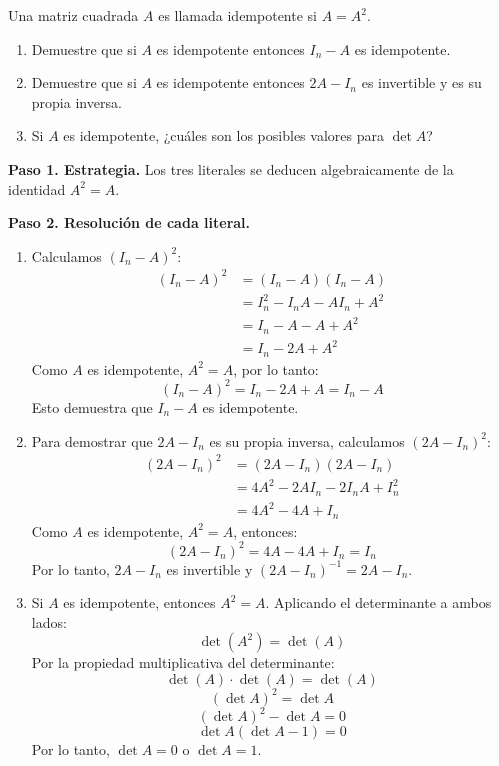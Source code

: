 \begin{prob} Una matriz cuadrada $A$ es llamada idempotente si $A=A^2.$
\begin{enumerate}[$(a)$]
\item Demuestre que si $A$ es idempotente entonces $I_n-A$ es idempotente.
\item Demuestre que si $A$ es idempotente entonces $2A-I_n$ es invertible y es su propia inversa.
\item Si $A$ es idempotente, ¿cuáles son los posibles valores para $\det A$?
\end{enumerate}

\begin{myproof}
\textbf{Paso 1. Estrategia.} Los tres literales se deducen algebraicamente de la identidad $A^2=A$.

\textbf{Paso 2. Resolución de cada literal.}
\begin{enumerate}[$(a)$]
\item Calculamos $(I_n-A)^2$:
\begin{align*}
(I_n-A)^2 &= (I_n-A)(I_n-A) \\
&= I_n^2 - I_nA - AI_n + A^2 \\
&= I_n - A - A + A^2 \\
&= I_n - 2A + A^2
\end{align*}
Como $A$ es idempotente, $A^2 = A$, por lo tanto:
$$(I_n-A)^2 = I_n - 2A + A = I_n - A$$
Esto demuestra que $I_n-A$ es idempotente.

\item Para demostrar que $2A-I_n$ es su propia inversa, calculamos $(2A-I_n)^2$:
\begin{align*}
(2A-I_n)^2 &= (2A-I_n)(2A-I_n) \\
&= 4A^2 - 2AI_n - 2I_nA + I_n^2 \\
&= 4A^2 - 4A + I_n
\end{align*}
Como $A$ es idempotente, $A^2 = A$, entonces:
$$(2A-I_n)^2 = 4A - 4A + I_n = I_n$$
Por lo tanto, $2A-I_n$ es invertible y $(2A-I_n)^{-1} = 2A-I_n$.

\item Si $A$ es idempotente, entonces $A^2 = A$. Aplicando el determinante a ambos lados:
$$\det(A^2) = \det(A)$$
Por la propiedad multiplicativa del determinante:
$$\det(A) \cdot \det(A) = \det(A)$$
$$(\det A)^2 = \det A$$
$$(\det A)^2 - \det A = 0$$
$$\det A(\det A - 1) = 0$$
Por lo tanto, $\boxed{\det A = 0 \text{ o } \det A = 1}$.
\end{enumerate}
\end{myproof}
\end{prob}

